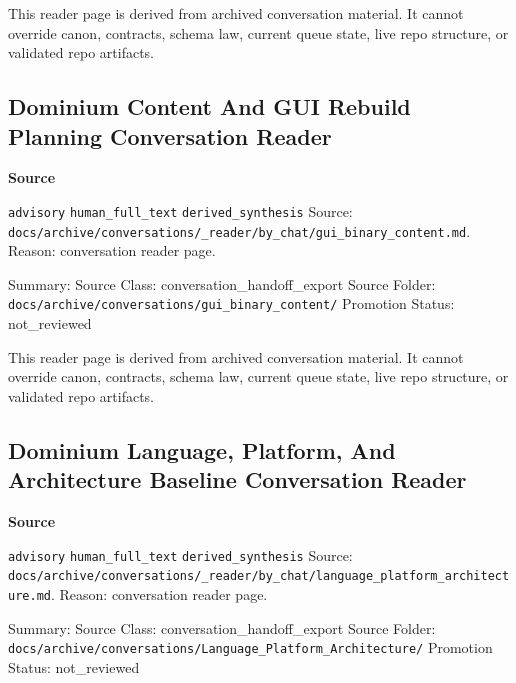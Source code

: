 \documentclass[9pt,a4paper,openany]{book}
\newcommand{\vonecallout}[3]{\par\medskip\noindent\begingroup\setlength{\fboxsep}{7pt}\colorbox{DomCalloutBg}{\parbox{0.94\linewidth}{\textbf{\textcolor{#1}{#2}}\par #3}}\endgroup\par\medskip}
\begin{document}
This reader page is derived from archived conversation material.\allowbreak{} It cannot override canon, contracts, schema law, current queue state, live repo structure, or validated repo artifacts.\allowbreak{}



\subsection{Dominium Content And GUI Rebuild Planning Conversation Reader}

\vonecallout{DomSlate}{Source}{\texttt{advisory} \texttt{human\_\allowbreak{}full\_\allowbreak{}text} \texttt{derived\_\allowbreak{}synthesis} Source: \texttt{docs/\allowbreak{}archive/\allowbreak{}conversations/\allowbreak{}\_\allowbreak{}reader/\allowbreak{}by\_\allowbreak{}chat/\allowbreak{}gui\_\allowbreak{}binary\_\allowbreak{}content.\allowbreak{}md}.\allowbreak{} Reason: conversation reader page.\allowbreak{}}

Summary: Source Class: conversation\_\allowbreak{}handoff\_\allowbreak{}export Source Folder: \texttt{docs/\allowbreak{}archive/\allowbreak{}conversations/\allowbreak{}gui\_\allowbreak{}binary\_\allowbreak{}content/\allowbreak{}} Promotion Status: not\_\allowbreak{}reviewed


This reader page is derived from archived conversation material.\allowbreak{} It cannot override canon, contracts, schema law, current queue state, live repo structure, or validated repo artifacts.\allowbreak{}



\subsection{Dominium Language, Platform, And Architecture Baseline Conversation Reader}

\vonecallout{DomSlate}{Source}{\texttt{advisory} \texttt{human\_\allowbreak{}full\_\allowbreak{}text} \texttt{derived\_\allowbreak{}synthesis} Source: \texttt{docs/\allowbreak{}archive/\allowbreak{}conversations/\allowbreak{}\_\allowbreak{}reader/\allowbreak{}by\_\allowbreak{}chat/\allowbreak{}language\_\allowbreak{}platform\_\allowbreak{}architecture.\allowbreak{}md}.\allowbreak{} Reason: conversation reader page.\allowbreak{}}

Summary: Source Class: conversation\_\allowbreak{}handoff\_\allowbreak{}export Source Folder: \texttt{docs/\allowbreak{}archive/\allowbreak{}conversations/\allowbreak{}Language\_\allowbreak{}Platform\_\allowbreak{}Architecture/\allowbreak{}} Promotion Status: not\_\allowbreak{}reviewed
\end{document}
